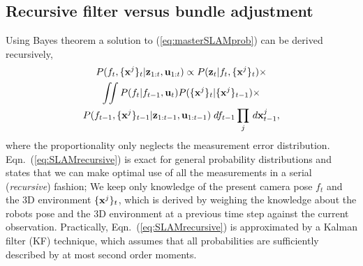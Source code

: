 \documentclass[conference]{IEEEtran}
\begin{document}
\subsection{Recursive filter versus bundle adjustment}
Using Bayes theorem a solution to (\ref{eq:masterSLAMprob}) can be derived recursively,
\begin{multline}
     P(f_t,\{{\bf x}^j\}_t| {\bf z}_{1:t},{\bf u}_{1:t}) \propto P({\bf z}_t | f_t,\{{\bf x}^j\}_t) \times \\
     \iint P( f_t | f_{t-1}, {\bf u}_t) P( \{{\bf x}^j\}_t | \{{\bf x}^j\}_{t-1} ) \times \\
     P(f_{t-1},\{{\bf x}^j\}_{t-1} | {\bf z}_{1:t-1},{\bf u}_{1:t-1} ) \; df_{t-1}\prod_j \, d{\bf x}^j_{t-1},
\label{eq:SLAMrecursive}
\end{multline}
where the proportionality only neglects the measurement error distribution.
Eqn.~(\ref{eq:SLAMrecursive}) is exact for general probability distributions and states that we can make
optimal use of all the measurements in a serial ({\em recursive}) fashion;  We keep only knowledge of the present camera pose $f_t$ and the 3D environment $\{{\bf x}^j\}_t$, which is derived by weighing the knowledge about the robots pose and the 3D environment at a previous time step against the current observation. Practically, 
Eqn.~(\ref{eq:SLAMrecursive}) is approximated by a Kalman filter (KF) technique, which assumes
that all probabilities are sufficiently described by at most second order moments.
\end{document}
